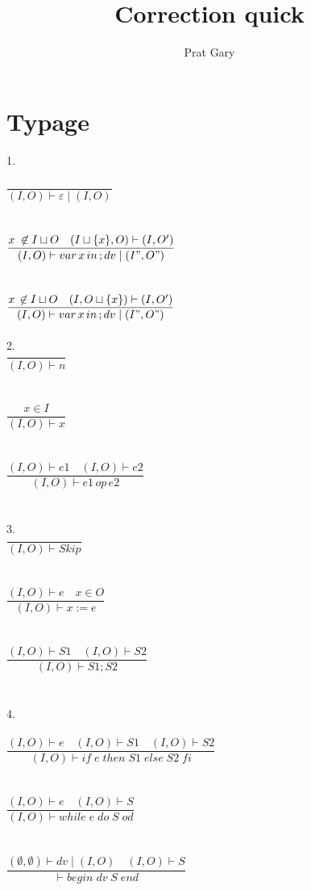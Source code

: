 \documentclass[10pt,a4paper]{article}
\author{Prat Gary}
\title{Correction quick}
\begin{document}
\maketitle
\section{Typage}
1.\\\\
$\dfrac{}{(I,O) \vdash \varepsilon \mid(I,O)}$
\\
\\\\
$\dfrac{x \; \not \in  I \sqcup O \quad (I \sqcup \lbrace x \rbrace ,O) \vdash (I,O')}{ (I,O) \vdash  var\, x\, in\, ;  dv \mid (I",O")}$
\\
\\\\
$\dfrac{x \, \not \in  I \sqcup O \quad (I ,O\sqcup \lbrace x \rbrace ) \vdash (I,O')}{ (I,O) \vdash  var\, x\, in\, ;  dv \mid (I",O")}$
\\
\\
2.\\
$\dfrac{}{(I,O) \vdash n}$
\\
\\\\
$\dfrac{x \in I}{(I,O) \vdash x}$
\\
\\\\
$\dfrac{(I,O)\vdash e1 \quad (I,O) \vdash e2}{(I,O) \vdash e1\, op\, e2}$
\\
\\\\
3.\\
$\dfrac{}{(I,O) \vdash Skip}$
\\
\\\\
$\dfrac{(I,O) \vdash e \quad x \in O}{(I,O) \vdash x :=e}$
\\
\\\\
$\dfrac{(I,O) \vdash S1 \quad (I,O) \vdash S2}{(I,O) \vdash S1;S2}$
\\
\\\\
4.\\\\
$\dfrac{(I,O) \vdash e \quad (I,O) \vdash S1 \quad (I,O) \vdash S2}{(I,O) \vdash if \; e \; then \; S1 \; else \; S2 \; fi}$
\\
\\\\
$\dfrac{(I,O) \vdash e \quad (I,O) \vdash S}{(I,O) \vdash while \; e \; do \; S \; od}$
\\
\\\\
$\dfrac{(\emptyset,\emptyset) \vdash dv \mid (I,O) \quad (I,O) \vdash S}{\vdash begin \; dv \; S\; end}$
\\\\
\\
\end{document}
